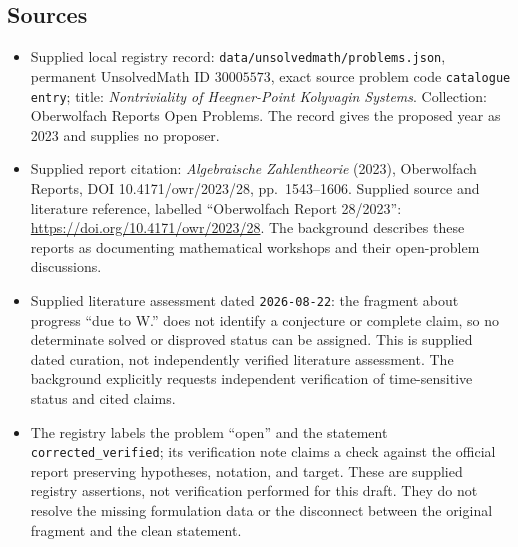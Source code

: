 \documentclass[11pt]{article}
\begin{document}
\subsection{Sources}
\begin{itemize}
\item Supplied local registry record: \texttt{data/unsolvedmath/problems.json}, permanent UnsolvedMath ID \(30005573\), exact source problem code \texttt{catalogue entry}; title: \emph{Nontriviality of Heegner-Point Kolyvagin Systems}. Collection: Oberwolfach Reports Open Problems. The record gives the proposed year as 2023 and supplies no proposer.
\item Supplied report citation: \emph{Algebraische Zahlentheorie} (2023), Oberwolfach Reports, DOI 10.4171/owr/2023/28, pp.\ 1543--1606. Supplied source and literature reference, labelled ``Oberwolfach Report 28/2023'': \url{https://doi.org/10.4171/owr/2023/28}. The background describes these reports as documenting mathematical workshops and their open-problem discussions.
\item Supplied literature assessment dated \texttt{2026-08-22}: the fragment about progress ``due to W.'' does not identify a conjecture or complete claim, so no determinate solved or disproved status can be assigned. This is supplied dated curation, not independently verified literature assessment. The background explicitly requests independent verification of time-sensitive status and cited claims.
\item The registry labels the problem ``open'' and the statement \texttt{corrected\_verified}; its verification note claims a check against the official report preserving hypotheses, notation, and target. These are supplied registry assertions, not verification performed for this draft. They do not resolve the missing formulation data or the disconnect between the original fragment and the clean statement.
\end{itemize}
\end{document}
